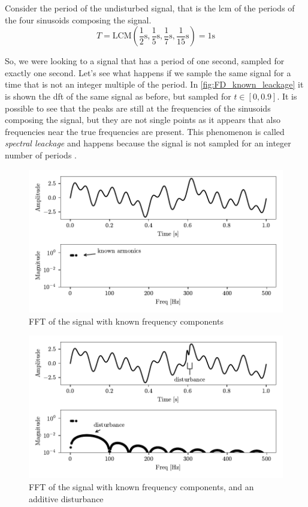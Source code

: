 Consider the period of the undisturbed signal, that is the \gls{lcm} of the periods of the four sinusoids composing the signal.
\[ 
    T = \text{LCM} \left( \frac{1}{2} \si{\s},\frac{1}{5}\si{\s},\frac{1}{7}\si{\s},\frac{1}{15}\si{\s} \right) = 1 \si{\s}
\]

So, we were looking to a signal that has a period of one second, sampled for exactly one second. Let's see what happens if we sample the same signal for a time that is not an integer multiple of the period. In \autoref{fig:FD_known_leackage} it is shown the \gls{dft} of the same signal as before, but sampled for $t \in [0, 0.9]$. It is possible to see that the peaks are still at the frequencies of the sinusoids composing the signal, but they are not single points as it appears that also frequencies near the true frequencies are present. This phenomenon is called \emph{spectral leackage} and happens because the signal is not sampled for an integer number of periods \cite{SpectralLeakage}. 


\begin{figure}
    \centering
    \includegraphics[scale=1]{images/FeatureExtraction/FD_known.pdf}
    \caption{FFT of the signal with known frequency components}
    \label{fig:FD_known}
\end{figure}

\begin{figure}
    \centering
    \includegraphics[scale=1]{images/FeatureExtraction/FD_known_dist.pdf}
    \caption{FFT of the signal with known frequency components, and an additive disturbance}
    \label{fig:FD_known_dist}
\end{figure}

